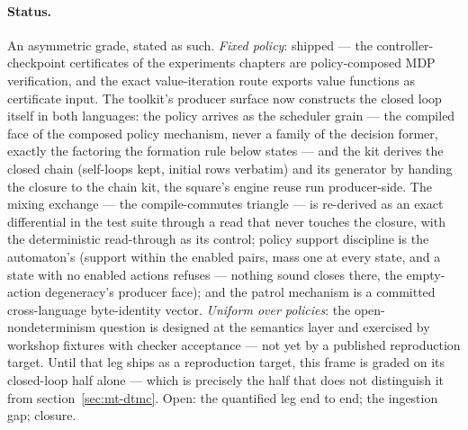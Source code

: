 \paragraph{Status.} An asymmetric grade, stated as such.
\emph{Fixed policy}: shipped --- the controller-checkpoint
certificates of the experiments chapters are policy-composed MDP
verification, and the exact value-iteration route
\cite{hartmanns19, quatmann18} exports value functions as
certificate input. The toolkit's producer surface now
constructs the closed loop itself in both languages: the policy
arrives as the scheduler grain --- the compiled face of the composed
policy mechanism, never a family of the decision former, exactly the
factoring the formation rule below states --- and the kit derives
the closed chain (self-loops kept, initial rows verbatim) and its
generator by handing the closure to the chain kit, the square's
engine reuse run producer-side. The mixing exchange --- the
compile-commutes triangle --- is re-derived as an exact differential
in the test suite through a read that never touches the closure,
with the deterministic read-through as its control; policy support
discipline is the automaton's (support within the enabled pairs,
mass one at every state, and a state with no enabled actions refuses
--- nothing sound closes there, the empty-action degeneracy's
producer face); and the patrol mechanism is a committed
cross-language byte-identity vector. \emph{Uniform over policies}: the
open-nondeterminism question is designed at the semantics layer and
exercised by workshop fixtures with checker acceptance --- not yet by
a published reproduction target. Until that leg ships as a
reproduction target, this frame is graded on its closed-loop half
alone --- which is precisely the
half that does not distinguish it from
section~\ref{sec:mt-dtmc}. Open: the quantified leg end to end; the
ingestion gap; closure.



